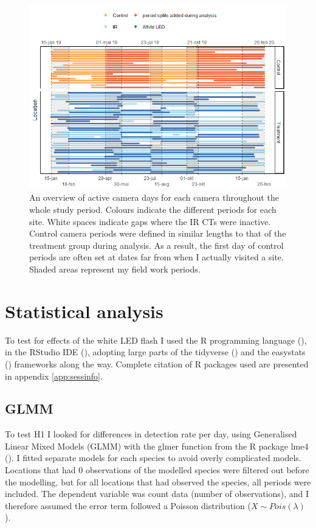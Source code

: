 \begin{figure}
		\centering
		\includegraphics[scale=.8]{../R/FLM_notebook_files/figure-gfm/effort-facet-1.png}	
\caption[An overview of active camera days]
{An overview of active camera days for each camera throughout the whole study period. %
Colours indicate the different periods for each site. White spaces indicate gaps where the IR CTs were inactive. Control camera periods were defined in similar lengths to that of the treatment group during analysis. As a result, the first day of control periods are often set at dates far from when I actually visited a site. Shaded areas represent my field work periods. \label{fig:timeseries}}
\end{figure}



\section{Statistical analysis} %

To test for effects of the white LED flash I used the R programming language (\cite{R-base}), in the RStudio IDE (\cite{RStudio}), adopting large parts of the tidyverse (\cite{tidyverse}) and the easystats (\cite{easystats}) frameworks along the way. Complete citation of R packages used are presented in appendix \ref{app:sessinfo}. 


	\subsection*{GLMM}
To test H1 I looked for differences in detection rate per day, using Generalised Linear Mixed Models (GLMM) with the glmer function from the R package lme4 (\cite{R-lme4}).
I fitted separate models for each species to avoid overly complicated models. 
Locations that had 0 observations of the modelled species were filtered out before the modelling, but for all locations that had observed the species, all periods were included.
The dependent variable was count data (number of observations), and I therefore assumed the error term followed a Poisson distribution ($ X \sim Pois(\lambda) $).

